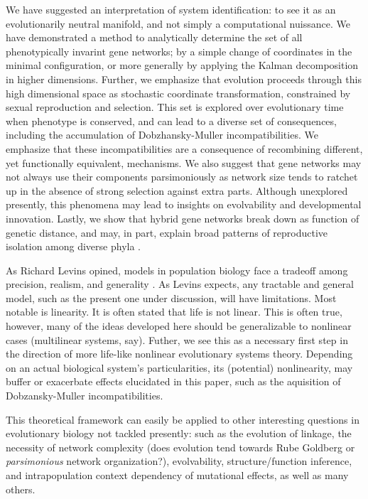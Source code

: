 \documentclass{article}
\newcommand{\jss}[1]{{\color{olive}\it #1}}
\newcommand{\1}{\mathbbm{1}}
\begin{document}
  We have suggested an interpretation of system identification: to see it as an evolutionarily neutral manifold, and not simply a computational nuissance. We have demonstrated a method to analytically determine the set of all phenotypically invarint gene networks; by a simple change of coordinates in the minimal configuration, or more generally by applying the Kalman decomposition in higher dimensions. Further, we emphasize that evolution proceeds through this high dimensional space as stochastic coordinate transformation, constrained by sexual reproduction and selection. This set is explored over evolutionary time when phenotype is conserved, and can lead to a diverse set of consequences, including the accumulation of Dobzhansky-Muller incompatibilities. We emphasize that these incompatibilities are a consequence of recombining different, yet functionally equivalent, mechanisms. We also suggest that gene networks may not always use their components parsimoniously as network size tends to ratchet up in the absence of strong selection against extra parts. Although unexplored presently, this phenomena may lead to insights on evolvability and developmental innovation. Lastly, we show that hybrid gene networks break down as function of genetic distance, and may, in part, explain broad patterns of reproductive isolation among diverse phyla \citep{roux2016shedding}.

  As Richard Levins opined, models in population biology face a tradeoff among precision, realism, and generality \citep{levins1966strategy}. As Levins expects, any tractable and general model, such as the present one under discussion, will have limitations. Most notable is linearity. It is often stated that life is not linear. This is often true, however, many of the ideas developed here should be generalizable to nonlinear cases (multilinear systems, say). Futher, we see this as a necessary first step in the direction of more life-like nonlinear evolutionary systems theory. Depending on an actual biological system's particularities, its (potential) nonlinearity, may buffer or exacerbate effects elucidated in this paper, such as the aquisition of Dobzansky-Muller incompatibilities.

  This theoretical framework can easily be applied to other interesting questions in evolutionary biology not tackled presently: such as the evolution of linkage, the necessity of network complexity (does evolution tend towards Rube Goldberg or \jss{parsimonious} network organization?), evolvability, structure/function inference, and intrapopulation context dependency of mutational effects, as well as many others.
\end{document}
